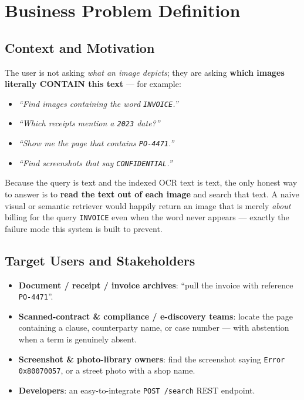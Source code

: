 \documentclass[12pt,a4paper]{article}
\begin{document}
\section{Business Problem Definition}

\subsection{Context and Motivation}

The user is not asking \emph{what an image depicts}; they are asking \textbf{which images literally CONTAIN this text} --- for example:
\begin{itemize}\setlength\itemsep{0.1em}
  \item \textit{``Find images containing the word \texttt{INVOICE}.''}
  \item \textit{``Which receipts mention a \texttt{2023} date?''}
  \item \textit{``Show me the page that contains \texttt{PO-4471}.''}
  \item \textit{``Find screenshots that say \texttt{CONFIDENTIAL}.''}
\end{itemize}

Because the query is text and the indexed OCR text is text, the only honest way to answer is to \textbf{read the text out of each image} and search that text. A naive visual or semantic retriever would happily return an image that is merely \emph{about} billing for the query \texttt{INVOICE} even when the word never appears --- exactly the failure mode this system is built to prevent.

\subsection{Target Users and Stakeholders}

\begin{itemize}\setlength\itemsep{0.1em}
  \item \textbf{Document / receipt / invoice archives}: ``pull the invoice with reference \texttt{PO-4471}''.
  \item \textbf{Scanned-contract \& compliance / e-discovery teams}: locate the page containing a clause, counterparty name, or case number --- with abstention when a term is genuinely absent.
  \item \textbf{Screenshot \& photo-library owners}: find the screenshot saying \texttt{Error 0x80070057}, or a street photo with a shop name.
  \item \textbf{Developers}: an easy-to-integrate \texttt{POST /search} REST endpoint.
\end{itemize}
\end{document}
